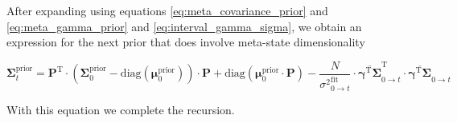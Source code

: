 \documentclass[pdflatex,sn-mathphys-num]{sn-jnl}%
\theoremstyle{thmstyleone}%
\theoremstyle{thmstyletwo}%
\theoremstyle{thmstylethree}%
\begin{document}
After expanding using equations \ref{eq:meta_covariance_prior} and \ref{eq:meta_gamma_prior} and \ref{eq:interval_gamma_sigma}, we obtain an expression for the next prior that does involve meta-state dimensionality


\begin{equation}
	\boldsymbol{\Sigma}^{\mathrm{prior}}_{t} = 
	\boldsymbol{P}^{\mathrm{T}} \cdot \left( \boldsymbol{\Sigma}^{\mathrm{prior}}_{0} - \mathrm{diag}(\boldsymbol{\mu}^{\mathrm{prior}}_{0}) \right) \cdot \boldsymbol{P}
	+ \mathrm{diag}(\boldsymbol{\mu}^{\mathrm{prior}}_{0} \cdot \boldsymbol{P}) 
	- \frac{N}{{\sigma^2}^{\mathrm{fit}}_{0 \rightarrow t}} \cdot
	\overline{\boldsymbol{\gamma}^{\mathrm{T}} \boldsymbol{\Sigma}}_{0 \rightarrow t}^{\mathrm{T}} \cdot \overline{\boldsymbol{\gamma}^{\mathrm{T}} \boldsymbol{\Sigma}}_{0 \rightarrow t}
	\label{eq:prior_covariance_update_0_t}
\end{equation}


With this equation we complete the recursion. 
\end{document}

